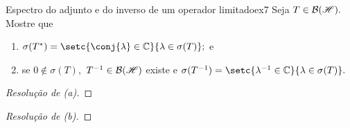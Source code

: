 \begin{exercício}{Espectro do adjunto e do inverso de um operador limitado}{ex7}
  Seja \(T \in \mathcal{B}(\mathscr{H}).\) Mostre que
  \begin{enumerate}[label=(\alph*)]
    \item \(\sigma(T^*) = \setc{\conj{\lambda} \in \mathbb{C}}{\lambda \in \sigma(T)};\) e
    \item se \(0 \notin \sigma(T),\) \(T^{-1} \in \mathcal{B}(\mathscr{H})\) existe e \(\sigma(T^{-1}) = \setc{\lambda^{-1} \in \mathbb{C}}{\lambda \in \sigma(T)}.\)
  \end{enumerate}
\end{exercício}
\begin{proof}[Resolução de (a)]

\end{proof}
\begin{proof}[Resolução de (b)]

\end{proof}
